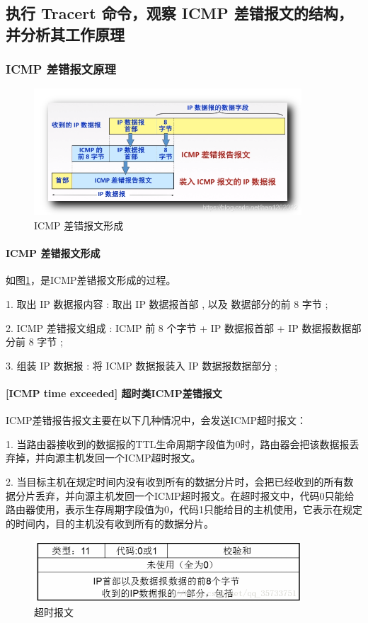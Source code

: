 \documentclass[a4paper,12pt]{report}
\begin{document}
\begin{spacing}{1.5}
\subsection{执行 Tracert 命令，观察 ICMP 差错报文的结构，并分析其工作原理}

\subsubsection{ICMP 差错报文原理}

\begin{figure}[htb!]
  \centering
\includegraphics[width=10cm]{figure/icmp-struct.png}
\caption{ICMP 差错报文形成}
\label{pic:icmp-struct}
\end{figure}
\paragraph*{ICMP 差错报文形成 }

如图\ref{pic:icmp-struct}，是ICMP差错报文形成的过程。

1. 取出 IP 数据报内容 : 取出 IP 数据报首部 , 以及 数据部分的前 8 字节 ;

2. ICMP 差错报文组成 : ICMP 前 8 个字节 + IP 数据报首部 + IP 数据报数据部分前 8 字节 ;

3. 组装 IP 数据报 : 将 ICMP 数据报装入 IP 数据报数据部分 ;

\paragraph*{[ICMP time exceeded] 超时类ICMP差错报文}

ICMP差错报告报文主要在以下几种情况中，会发送ICMP超时报文： 

1. 当路由器接收到的数据报的TTL生命周期字段值为0时，路由器会把该数据报丢弃掉，并向源主机发回一个ICMP超时报文。

2. 当目标主机在规定时间内没有收到所有的数据分片时，会把已经收到的所有数据分片丢弃，并向源主机发回一个ICMP超时报文。在超时报文中，代码0只能给路由器使用，表示生存周期字段值为0，代码1只能给目的主机使用，它表示在规定的时间内，目的主机没有收到所有的数据分片。 
\begin{figure}[htb!]
  \centering
\includegraphics[width=10cm]{figure/outoftime.png}
\caption{超时报文}
\label{pic:time}
\end{figure}
 


\end{spacing}
\end{document}
